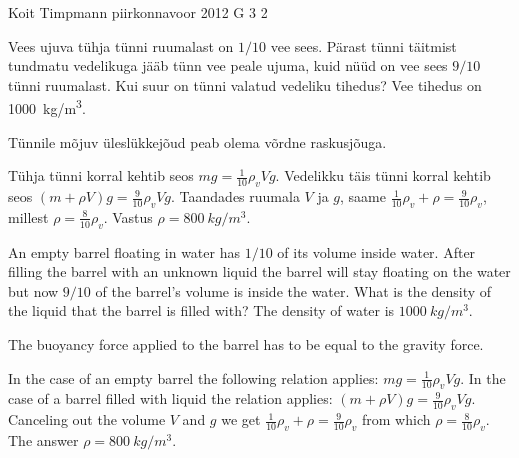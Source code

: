 {Koit Timpmann} %
{piirkonnavoor} %
{2012} %
{G 3} %
{2} %
{
\ifStatement
Vees ujuva tühja tünni ruumalast on $1/10$ vee sees. Pärast tünni täitmist
tundmatu vedelikuga jääb tünn vee peale ujuma, kuid nüüd on vee sees $9/10$ tünni
ruumalast. Kui suur on tünni valatud vedeliku tihedus? Vee tihedus on
\SI{1000}{kg/m^3}.
\fi


\ifHint
Tünnile mõjuv üleslükkejõud peab olema võrdne raskusjõuga.
\fi


\ifSolution
Tühja tünni korral kehtib seos $mg=\frac 1{10}\rho_vVg$.
Vedelikku täis tünni korral kehtib seos	 $(m+\rho V)g=\frac 9{10}\rho_vVg$.
Taandades ruumala $V$ ja $g$, saame  $\frac 1{10}\rho_v+\rho=\frac 9{10}\rho_v$, millest $\rho=\frac 8{10}\rho_v$.
Vastus $\rho= \SI{800}{kg/m^3}$.
\fi


\ifEngStatement
An empty barrel floating in water has $1/10$ of its volume inside water. After filling the barrel with an unknown liquid the barrel will stay floating on the water but now $9/10$ of the barrel’s volume is inside the water. What is the density of the liquid that the barrel is filled with? The density of water is $\SI{1000}{kg/m^3}$.
\fi


\ifEngHint
The buoyancy force applied to the barrel has to be equal to the gravity force.
\fi


\ifEngSolution
In the case of an empty barrel the following relation applies: $mg=\frac 1{10}\rho_vVg$. In the case of a barrel filled with liquid the relation applies: $(m+\rho V)g=\frac 9{10}\rho_vVg$. Canceling out the volume $V$ and $g$ we get $\frac 1{10}\rho_v+\rho=\frac 9{10}\rho_v$ from which $\rho=\frac 8{10}\rho_v$. The answer $\rho= \SI{800}{kg/m^3}$.
\fi
}